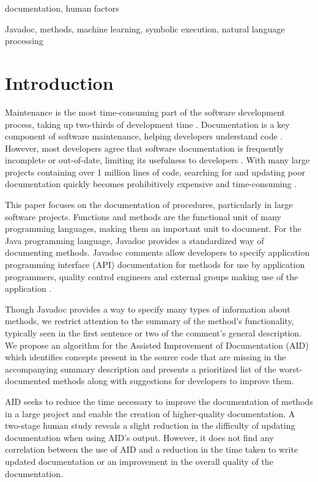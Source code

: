 \documentclass[preprint]{sigplanconf}
\begin{document}
\terms
documentation, human factors

\keywords
Javadoc, methods, machine learning, symbolic execution, natural language processing

\section{Introduction}
Maintenance is the most time-consuming part of the software development process, taking up two-thirds of development time \cite{buse10}. Documentation is a key component of software maintenance, helping developers understand code \cite{desouza}. However, most developers agree that software documentation is frequently incomplete or out-of-date, limiting its usefulness to developers \cite{lethbridge}. With many large projects containing over 1 million lines of code, searching for and updating poor documentation quickly becomes prohibitively expensive and time-consuming \citep{windows, mac, linux}.

This paper focuses on the documentation of procedures, particularly in large software projects. Functions and methods are the functional unit of many programming languages, making them an important unit to document. For the Java programming language, Javadoc provides a standardized way of documenting methods. Javadoc comments allow developers to specify application programming interface (API) documentation for methods for use by application programmers, quality control engineers and external groups making use of the application \cite{kramer}.

Though Javadoc provides a way to specify many types of information about methods, we restrict attention to the summary of the method's functionality, typically seen in the first sentence or two of the comment's general description. We propose an algorithm for the Assisted Improvement of Documentation (AID) which identifies concepts present in the source code that are missing in the accompanying summary description and presents a prioritized list of the worst-documented methods along with suggestions for developers to improve them.

AID seeks to reduce the time necessary to improve the documentation of methods in a large project and enable the creation of higher-quality documentation. A two-stage human study reveals a slight reduction in the difficulty of updating documentation when using AID's output. However, it does not find any correlation between the use of AID and a reduction in the time taken to write updated documentation or an improvement in the overall quality of the documentation.
\end{document}
